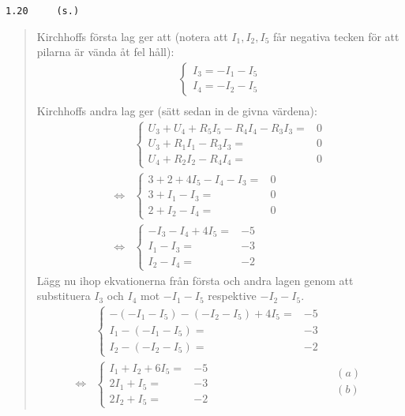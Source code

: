 \documentclass[a4paper]{article}
\newcommand{\tskcol}[1]{\textcolor{tskcol}{#1}}
\begin{document}
\texttt{\tskcol{1.20~~~~ (s.)}}
\begin{quotation}
	\noindent
	Kirchhoffs första lag ger att (notera att $I_1,I_2,I_5$ får negativa tecken för att pilarna är vända åt fel håll):
	\begin{align*}
	\begin{cases}
	I_3=-I_1-I_5 \\
	I_4=-I_2-I_5
	\end{cases} \\ 
	\end{align*}
	Kirchhoffs andra lag ger (sätt sedan in de givna värdena):
	\begin{align*}
	&\left\{\begin{array}{rl}
	U_3+U_4+R_5I_5-R_4I_4-R_3I_3=&0 \\
	U_3+R_1I_1-R_3I_3           =&0 \\
	U_4+R_2I_2-R_4I_4           =&0
	\end{array}\right. \\ \Leftrightarrow
	&\left\{\begin{array}{rl}
	3+2+4I_5-I_4-I_3=&0 \\
	3+I_1-I_3       =&0 \\
	2+I_2-I_4       =&0
	\end{array}\right. \\ \Leftrightarrow
	&\left\{\begin{array}{rl}
	-I_3-I_4+4I_5=&-5 \\
	I_1-I_3=&-3 \\
	I_2-I_4=&-2
	\end{array}\right.
	\end{align*}
	Lägg nu ihop ekvationerna från första och andra lagen genom att substituera $I_3$ och $I_4$ mot $-I_1-I_5$ respektive $-I_2-I_5$.
	\begin{align*}
	&\left\{\begin{array}{rr}
	-(-I_1-I_5)-(-I_2-I_5)+4I_5=&-5 \\
	I_1-(-I_1-I_5)=&-3 \\
	I_2-(-I_2-I_5)=&-2 
	\end{array}\right. \\ \Leftrightarrow
	&\left\{\begin{array}{rr}
	I_1+I_2+6I_5=&-5 \\
	2I_1+I_5=&-3 \\
	2I_2+I_5=&-2 
	\end{array}\right.
	&\begin{array}{l}
	(a) \\
	(b) \\

\end{array}
\end{align*}
\end{quotation}
\end{document}
